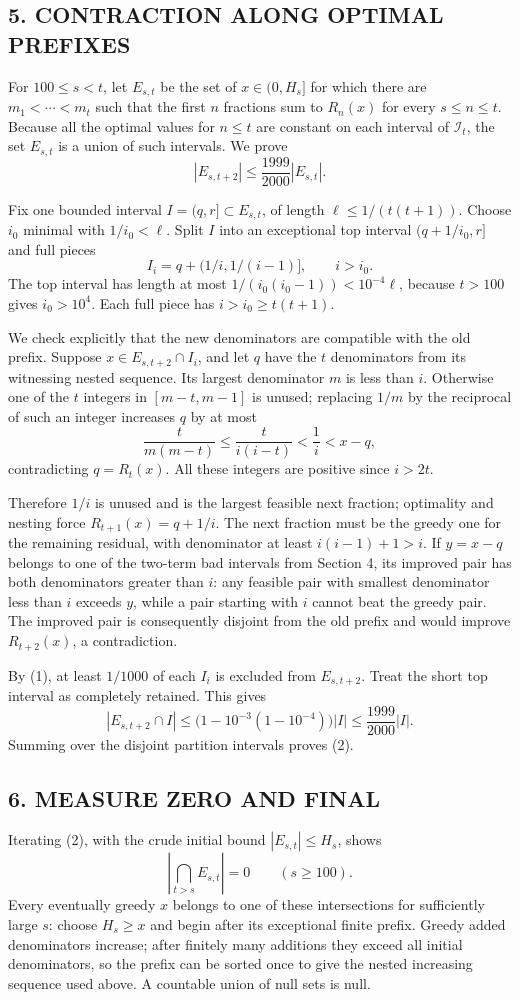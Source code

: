 \subsection*{5. CONTRACTION ALONG OPTIMAL PREFIXES}
For $100\le s<t$, let $E_{s,t}$ be the set of $x\in(0,H_s]$ for which there are $m_1<\cdots<m_t$ such that the first $n$ fractions sum to $R_n(x)$ for every $s\le n\le t$. Because all the optimal values for $n\le t$ are constant on each interval of $\mathcal I_t$, the set $E_{s,t}$ is a union of such intervals. We prove
\[
 |E_{s,t+2}|\le\frac{1999}{2000}|E_{s,t}|.              \tag{2}
\]

Fix one bounded interval $I=(q,r]\subset E_{s,t}$, of length $\ell\le1/(t(t+1))$. Choose $i_0$ minimal with $1/i_0<\ell$. Split $I$ into an exceptional top interval $(q+1/i_0,r]$ and full pieces
\[
 I_i=q+(1/i,1/(i-1)],\qquad i>i_0.
\]
The top interval has length at most $1/(i_0(i_0-1))<10^{-4}\ell$, because $t>100$ gives $i_0>10^4$. Each full piece has $i>i_0\ge t(t+1)$.

We check explicitly that the new denominators are compatible with the old prefix. Suppose $x\in E_{s,t+2}\cap I_i$, and let $q$ have the $t$ denominators from its witnessing nested sequence. Its largest denominator $m$ is less than $i$. Otherwise one of the $t$ integers in $[m-t,m-1]$ is unused; replacing $1/m$ by the reciprocal of such an integer increases $q$ by at most
\[
 \frac{t}{m(m-t)}\le\frac{t}{i(i-t)}<\frac1i<x-q,
\]
contradicting $q=R_t(x)$. All these integers are positive since $i>2t$.

Therefore $1/i$ is unused and is the largest feasible next fraction; optimality and nesting force $R_{t+1}(x)=q+1/i$. The next fraction must be the greedy one for the remaining residual, with denominator at least $i(i-1)+1>i$. If $y=x-q$ belongs to one of the two-term bad intervals from Section 4, its improved pair has both denominators greater than $i$: any feasible pair with smallest denominator less than $i$ exceeds $y$, while a pair starting with $i$ cannot beat the greedy pair. The improved pair is consequently disjoint from the old prefix and would improve $R_{t+2}(x)$, a contradiction.

By (1), at least $1/1000$ of each $I_i$ is excluded from $E_{s,t+2}$. Treat the short top interval as completely retained. This gives
\[
 |E_{s,t+2}\cap I|
 \le\bigl(1-10^{-3}(1-10^{-4})\bigr)|I|
 \le\frac{1999}{2000}|I|.
\]
Summing over the disjoint partition intervals proves (2).
\subsection*{6. MEASURE ZERO AND FINAL}
Iterating (2), with the crude initial bound $|E_{s,t}|\le H_s$, shows
\[
 \left|\bigcap_{t>s}E_{s,t}\right|=0\qquad(s\ge100).
\]
Every eventually greedy $x$ belongs to one of these intersections for sufficiently large $s$: choose $H_s\ge x$ and begin after its exceptional finite prefix. Greedy added denominators increase; after finitely many additions they exceed all initial denominators, so the prefix can be sorted once to give the nested increasing sequence used above. A countable union of null sets is null.


